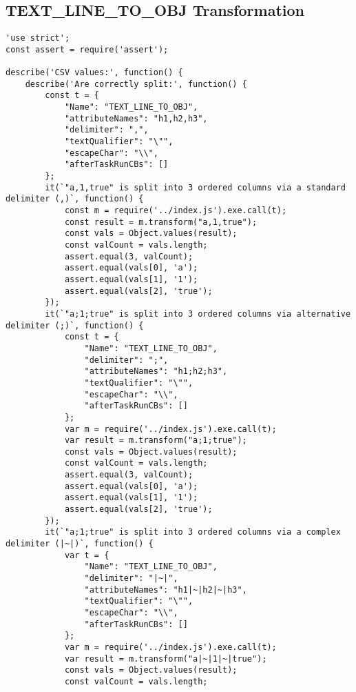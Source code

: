 \subsection{TEXT\_LINE\_TO\_OBJ Transformation}
\label{TEXT_LINE_TO_OBJ-tests}
\begin{verbatim}
'use strict';
const assert = require('assert');

describe('CSV values:', function() {
    describe('Are correctly split:', function() {
        const t = {
            "Name": "TEXT_LINE_TO_OBJ",
            "attributeNames": "h1,h2,h3",
            "delimiter": ",",
            "textQualifier": "\"",
            "escapeChar": "\\",
            "afterTaskRunCBs": []
        };
        it(`"a,1,true" is split into 3 ordered columns via a standard delimiter (,)`, function() {
            const m = require('../index.js').exe.call(t);
            const result = m.transform("a,1,true");
            const vals = Object.values(result);
            const valCount = vals.length;
            assert.equal(3, valCount);
            assert.equal(vals[0], 'a');
            assert.equal(vals[1], '1');
            assert.equal(vals[2], 'true');
        });
        it(`"a;1;true" is split into 3 ordered columns via alternative delimiter (;)`, function() {
            const t = {
                "Name": "TEXT_LINE_TO_OBJ",
                "delimiter": ";",
                "attributeNames": "h1;h2;h3",
                "textQualifier": "\"",
                "escapeChar": "\\",
                "afterTaskRunCBs": []
            };
            var m = require('../index.js').exe.call(t);
            var result = m.transform("a;1;true");
            const vals = Object.values(result);
            const valCount = vals.length;
            assert.equal(3, valCount);
            assert.equal(vals[0], 'a');
            assert.equal(vals[1], '1');
            assert.equal(vals[2], 'true');
        });
        it(`"a;1;true" is split into 3 ordered columns via a complex delimiter (|~|)`, function() {
            var t = {
                "Name": "TEXT_LINE_TO_OBJ",
                "delimiter": "|~|",
                "attributeNames": "h1|~|h2|~|h3",
                "textQualifier": "\"",
                "escapeChar": "\\",
                "afterTaskRunCBs": []
            };
            var m = require('../index.js').exe.call(t);
            var result = m.transform("a|~|1|~|true");
            const vals = Object.values(result);
            const valCount = vals.length;

\end{verbatim}
